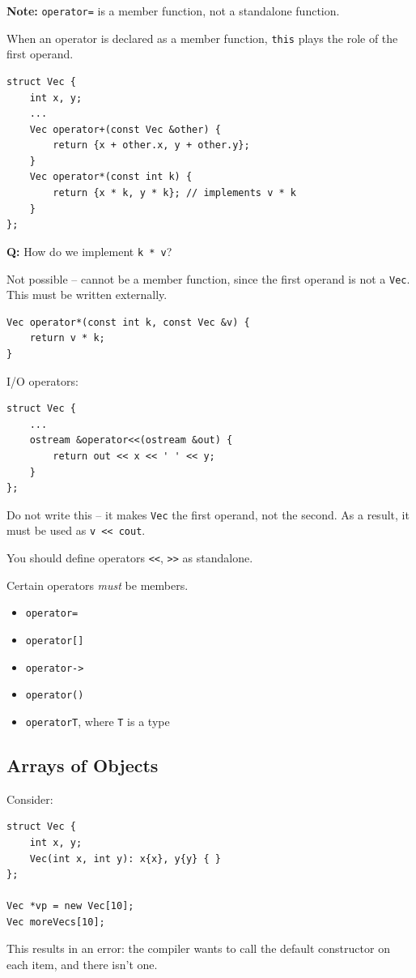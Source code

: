 \documentclass[11pt]{article}
\theoremstyle{definition}
\begin{document}
\vspace{0.1cm}
{\bf Note:} {\tt operator=} is a member function, not a standalone function. 

When an operator is declared as a member function, {\tt *this} plays the role of the first operand. 
\begin{lstlisting}
struct Vec {
    int x, y;
    ...
    Vec operator+(const Vec &other) {
        return {x + other.x, y + other.y};
    }
    Vec operator*(const int k) {
        return {x * k, y * k}; // implements v * k
    }
};
\end{lstlisting}
{\bf Q:} How do we implement {\tt k * v}? 

Not possible -- cannot be a member function, since the first operand is not a {\tt Vec}. This must be written externally.
\begin{lstlisting}
Vec operator*(const int k, const Vec &v) {
    return v * k;
}
\end{lstlisting}
I/O operators:
\begin{lstlisting}
struct Vec {
    ... 
    ostream &operator<<(ostream &out) {
        return out << x << ' ' << y;
    }
};
\end{lstlisting}
Do not write this -- it makes {\tt Vec} the first operand, not the second. As a result, it must be used as {\tt v <\null< cout}. 

You should define operators {\tt <\null<}, {\tt >\null>} as standalone.

Certain operators {\it must} be members. \vspace{-0.25cm}
\begin{itemize}
    \item {\tt operator=}
    \item {\tt operator[]}
    \item {\tt operator->}
    \item {\tt operator()}
    \item {\tt operatorT}, where {\tt T} is a type
\end{itemize}

\subsection{Arrays of Objects}
Consider:
\begin{lstlisting}
struct Vec {
    int x, y;
    Vec(int x, int y): x{x}, y{y} { }
};

Vec *vp = new Vec[10];
Vec moreVecs[10];
\end{lstlisting}
This results in an error: the compiler wants to call the default constructor on each item, and there isn't one.
\end{document}
